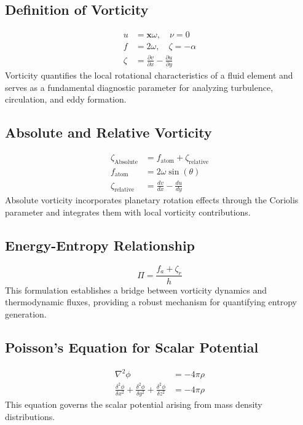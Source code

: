     \subsection{Definition of Vorticity}
    \begin{align}
        u &= \boldsymbol{x} \omega, \quad \nu=0 \\
        f &= 2 \omega, \quad \zeta=-\alpha \\
        \zeta &= \frac{\partial v}{\partial x} - \frac{\partial u}{\partial y}
    \end{align}
    Vorticity quantifies the local rotational characteristics of a fluid element and serves as a fundamental diagnostic parameter for analyzing turbulence, circulation, and eddy formation.

    \subsection{Absolute and Relative Vorticity}
    \begin{align}
        \zeta_\text{Absolute} &= f_\text{atom} + \zeta_\text{relative} \\
        f_\text{atom} &= 2 \omega \sin(\theta) \\
        \zeta_{\text {relative }} &=\frac{d v}{d x}-\frac{d u}{d y}
    \end{align}
    Absolute vorticity incorporates planetary rotation effects through the Coriolis parameter and integrates them with local vorticity contributions.

    \subsection{Energy-Entropy Relationship}
    \begin{equation}
        \Pi = \frac{f_a + \zeta_r}{h}
    \end{equation}
    This formulation establishes a bridge between vorticity dynamics and thermodynamic fluxes, providing a robust mechanism for quantifying entropy generation.

    \subsection{Poisson’s Equation for Scalar Potential}
    \begin{align}
        \nabla^2 \phi &= -4 \pi \rho \\
        \frac{\delta^2 \phi}{\delta x^2}+\frac{\delta^2 \phi}{\delta y^2}+\frac{\delta^2 \phi}{\delta z^2} &= -4 \pi \rho
    \end{align}
    This equation governs the scalar potential arising from mass density distributions.

